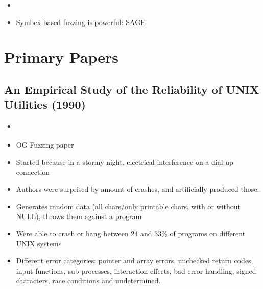 \documentclass{article}
\begin{document}
\begin{itemize}
\begin{itemize}
          \item {}\cite{EvaluatingFuzzTesting}
        \end{itemize}
  \item {}\cite{AllYouEverWanted}
  \item Symbex-based fuzzing is powerful: SAGE\cite{SAGE} \cite{FuzzingTheStateOfTheArt}
\end{itemize}


\pagebreak
\section{Primary Papers}
\subsection{An Empirical Study of the Reliability of UNIX Utilities (1990)}
\begin{itemize}
  \item \cite{UNIX}
  \item OG Fuzzing paper
  \item Started because in a stormy night, electrical interference on a dial-up connection
  \item Authors were surprised by amount of crashes, and artificially produced those.
  \item Generates random data (all chars/only printable chars, with or without NULL), throws them against a program
  \item Were able to crash or hang between 24 and 33\% of programs on different UNIX systems
  \item Different error categories: pointer and array errors, unchecked return codes, input functions, sub-processes, interaction effects, bad error handling, signed characters, race conditions and undetermined.
\end{itemize}
\end{document}

